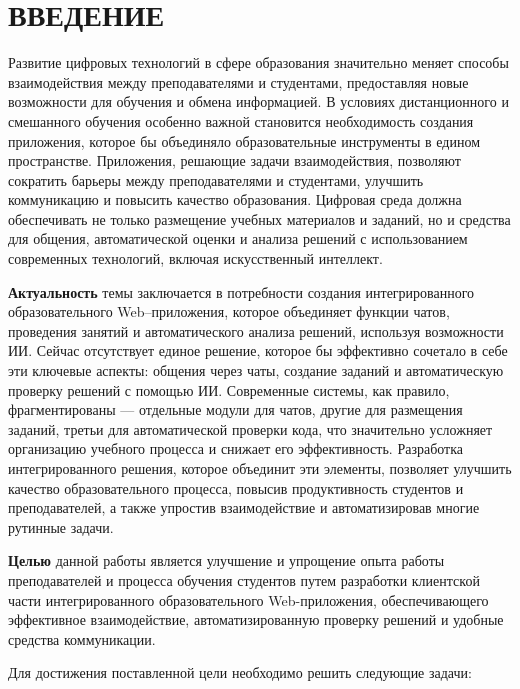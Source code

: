 \newpage
{}
\section*{ВВЕДЕНИЕ}

Развитие цифровых технологий в сфере образования значительно меняет способы взаимодействия между преподавателями и студентами, предоставляя новые возможности для обучения и обмена информацией. В условиях дистанционного и смешанного обучения особенно важной становится необходимость создания приложения, которое бы объединяло образовательные инструменты в едином пространстве. Приложения, решающие задачи взаимодействия, позволяют сократить барьеры между преподавателями и студентами, улучшить коммуникацию и повысить качество образования. Цифровая среда должна обеспечивать не только размещение учебных материалов и заданий, но и средства для общения, автоматической оценки и анализа решений с использованием современных технологий, включая искусственный интеллект.

\textbf{Актуальность} темы заключается в потребности создания интегрированного образовательного Web–приложения, которое объединяет функции чатов, проведения занятий и автоматического анализа решений, используя возможности ИИ. Сейчас отсутствует единое решение, которое бы эффективно сочетало в себе эти ключевые аспекты: общения через чаты, создание заданий и автоматическую проверку решений с помощью ИИ. Современные системы, как правило, фрагментированы — отдельные модули для чатов, другие для размещения заданий, третьи для автоматической проверки кода, что значительно усложняет организацию учебного процесса и снижает его эффективность. Разработка интегрированного решения, которое объединит эти элементы, позволяет улучшить качество образовательного процесса, повысив продуктивность студентов и преподавателей, а также упростив взаимодействие и автоматизировав многие рутинные задачи.

\textbf{Целью} данной работы является улучшение и упрощение опыта работы преподавателей и процесса обучения студентов путем разработки клиентской части интегрированного образовательного Web-приложения, обеспечивающего эффективное взаимодействие, автоматизированную проверку решений и удобные средства коммуникации.

Для достижения поставленной цели необходимо решить следующие задачи:

